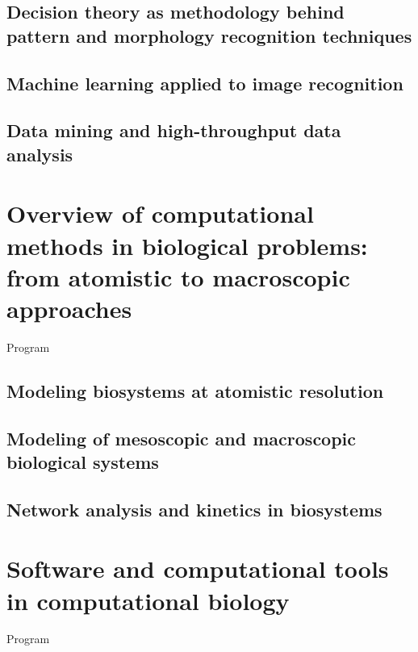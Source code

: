 \documentclass[10pt]{beamer}              %
\begin{document}
\subsection{Decision theory as methodology behind pattern and morphology recognition techniques}

\subsection{Machine learning applied to image recognition}

\subsection{Data mining and high-throughput data analysis}

\section{Overview of computational methods in  biological problems: from atomistic to macroscopic approaches}
\begin{frame}{Program} 
\tableofcontents [sectionstyle=show/shaded,subsectionstyle=show/show/hide] 
\end{frame}

\subsection{Modeling biosystems at atomistic resolution}

\subsection{Modeling of mesoscopic and macroscopic biological systems}

\subsection{Network analysis and kinetics in biosystems}


\section{Software and computational tools in computational biology}
\begin{frame}{Program} 
\tableofcontents [sectionstyle=show/shaded,subsectionstyle=show/show/hide] 
\end{frame}
\end{document}
